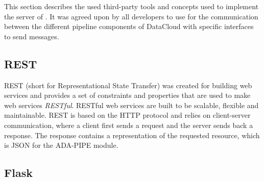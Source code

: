 \documentclass{article}
\begin{document}
        This section describes the used third-party tools and concepts used to implement the server of .
        It was agreed upon by all developers to use  for the communication between the different pipeline components of DataCloud with specific interfaces to send messages.

        \subsection{REST}
        \label{sec:rest-server}

            REST \cite{redhatWhatRESTAPI} (short for Representational State Transfer) was created for building web services and provides a set of constraints and properties
            that are used to make web services \emph{RESTful}. RESTful web services are built to be scalable, flexible and maintainable.
            REST is based on the HTTP protocol and relies on client-server communication, where a client first sends a request and the server sends back a response.
            The response contains a representation of the requested resource, which is JSON for the ADA-PIPE module.



        \subsection{Flask}
        \label{sec:flask-server}
\end{document}
